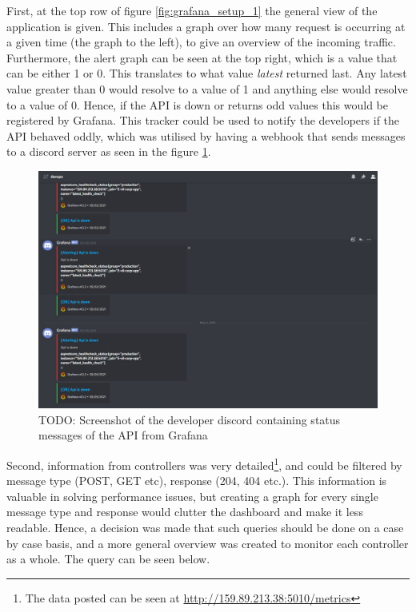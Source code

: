 \documentclass[report/main.tex]{subfiles}
\begin{document}
            First, at the top row of figure \ref{fig:grafana_setup_1} the general view of the application is given. This includes a graph over how many request is occurring at a given time (the graph to the left), to give an overview of the incoming traffic. Furthermore, the alert graph can be seen at the top right, which is a value that can be either 1 or 0. This translates to what value \textit{latest} returned last. Any latest value greater than 0 would resolve to a value of 1 and anything else would resolve to a value of 0. Hence, if the API is down or returns odd values this would be registered by Grafana. This tracker could be used to notify the developers if the API behaved oddly, which was utilised by having a webhook that sends messages to a discord server as seen in the figure \ref{fig:grafana_discord_alert}.
                
            \begin{figure}[H]
                \centering
                \includegraphics[width=\textwidth]{report/images/Grafana Discord Alert.jpg}
                \caption{TODO: Screenshot of the developer discord containing status messages of the API from Grafana}
                \label{fig:grafana_discord_alert}
            \end{figure}
            
            Second, information from controllers was very detailed\footnote{The data posted can be seen at \hyperlink{http://159.89.213.38:5010/metrics}{http://159.89.213.38:5010/metrics}}, and could be filtered by message type (POST, GET etc), response (204, 404 etc.). This information is valuable in solving performance issues, but creating a graph for every single message type and response would clutter the dashboard and make it less readable. Hence, a decision was made that such queries should be done on a case by case basis, and a more general overview was created to monitor each controller as a whole. The query can be seen below.
                
\end{document}
